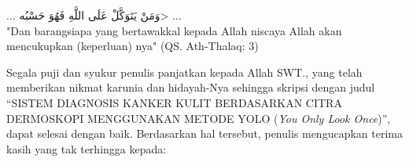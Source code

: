 \documentclass[]{mathuinsa}
\begin{document}
    \cover\titlepage

    \approvalpageBeforeExam
    \approvalpage
    \declarepage


    \motto


    \begin{center}
        $\ldots$ \<وَمَنْ يَتَوَكَّلْ عَلَى اللَّهِ فَهُوَ حَسْبُه> $\ldots$ \\
        {"}Dan barangsiapa yang bertawakkal kepada Allah niscaya Allah akan mencukupkan (keperluan) nya{"}
        (QS. Ath-Thalaq: 3)
    \end{center}


    \acknowledment
    \begin{center}
        \emph{}
    \end{center}

    \preface
    Segala puji dan syukur penulis panjatkan kepada Allah SWT., yang telah memberikan nikmat karunia dan hidayah-Nya sehingga skripsi dengan judul “SISTEM DIAGNOSIS KANKER KULIT BERDASARKAN CITRA DERMOSKOPI MENGGUNAKAN METODE YOLO (\textit{You Only Look Once})”, dapat selesai dengan baik. Berdasarkan hal tersebut, penulis mengucapkan terima kasih yang tak terhingga kepada:
\end{document}
